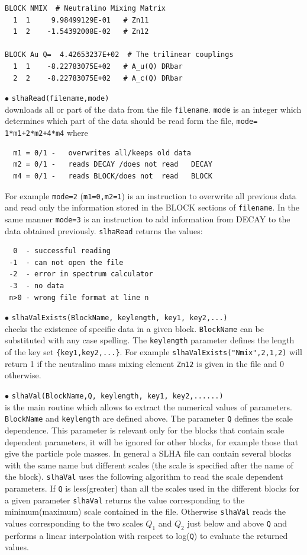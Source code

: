 \documentclass[12pt,a4paper]{article}
\begin{document}
{{\begin{verbatim}
BLOCK NMIX  # Neutralino Mixing Matrix
  1  1     9.98499129E-01   # Zn11
  1  2    -1.54392008E-02   # Zn12

BLOCK Au Q=  4.42653237E+02  # The trilinear couplings
  1  1    -8.22783075E+02   # A_u(Q) DRbar
  2  2    -8.22783075E+02   # A_c(Q) DRbar
\end{verbatim}
}  

\noindent
$\bullet$ \verb|slhaRead(filename,mode)|\\
downloads all or  part of the data  from the file \verb|filename|.
\verb|mode| is an integer which determines which part of the data should be read form the file, 
\verb|mode= 1*m1+2*m2+4*m4|  where
\begin{verbatim}
  m1 = 0/1 -   overwrites all/keeps old data                                                                                
  m2 = 0/1 -   reads DECAY /does not read   DECAY
  m4 = 0/1 -   reads BLOCK/does not  read   BLOCK
\end{verbatim}
For example \verb|mode=2| (\verb|m1=0,m2=1|) is an instruction to overwrite all previous data and 
read only the information stored in the BLOCK sections of
\verb|filename|. In the same manner \verb|mode=3| is an instruction to add information from DECAY 
to the data obtained previously. \verb|slhaRead| returns the values:
\begin{verbatim}
  0  - successful reading
 -1  - can not open the file
 -2  - error in spectrum calculator
 -3  - no data
 n>0 - wrong file format at line n
\end{verbatim}
%
\noindent
$\bullet$ \verb|slhaValExists(BlockName, keylength, key1, key2,...)|\\
checks the existence of specific data in a given block. 
\verb|BlockName| can  be substituted with any case spelling.
The \verb|keylength| parameter defines the length of the key set
\verb|{key1,key2,...}|. 
For example
     \verb|slhaValExists("Nmix",2,1,2)|
will return 1 if the neutralino mass mixing element \verb|Zn12| is given in the file and 
0 otherwise.

\noindent
$\bullet$ \verb|slhaVal(BlockName,Q, keylength, key1, key2,......)|\\
is the main routine which allows to  extract the  numerical values of parameters.
\verb|BlockName| and \verb|keylength| are defined above.
The parameter \verb|Q| defines  the scale dependence. 
This parameter is relevant only for the blocks that contain scale dependent parameters, it will be ignored for other
blocks, for example those that give the particle pole masses. 
In general a SLHA file can contain several blocks with 
the same name but different scales (the scale is specified after the name of the block).
\verb|slhaVal| uses the following algorithm to read the scale dependent parameters. 
If \verb|Q| is less(greater) than all the  scales used in the different blocks for a given parameter 
\verb|slhaVal| returns the value corresponding to the minimum(maximum) scale contained in the file.
Otherwise \verb|slhaVal| reads the values corresponding to the two scales $Q_1$ and $Q_2$ just below and above
\verb|Q| and performs a linear interpolation with respect to log(\verb|Q|) to evaluate the 
returned values.


}
\end{document}
